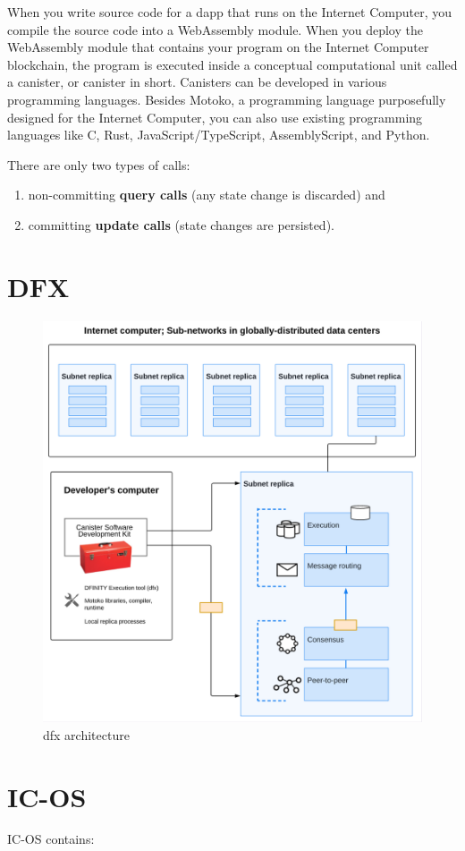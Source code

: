 When you write source code for a dapp that runs on the Internet Computer, you compile the source code into a WebAssembly module. When you deploy the WebAssembly module that contains your program on the Internet Computer blockchain, the program is executed inside a conceptual computational unit called a canister, or canister in short. Canisters can be developed in various programming languages. Besides Motoko, a programming language purposefully designed for the Internet Computer, you can also use existing programming languages like C, Rust, JavaScript/TypeScript, AssemblyScript, and Python.

There are only two types of calls:

\begin{enumerate}
  \item non-committing \textbf{query calls} (any state change is discarded) and
  \item committing \textbf{update calls} (state changes are persisted).
\end{enumerate}

\section{DFX}

\begin{figure}
	\centering
	\includegraphics[width=.5\linewidth]{figures/dfx.png}
	\caption{dfx architecture}
	\label{fig:dfx}
\end{figure}

\section{IC-OS}

IC-OS contains:

